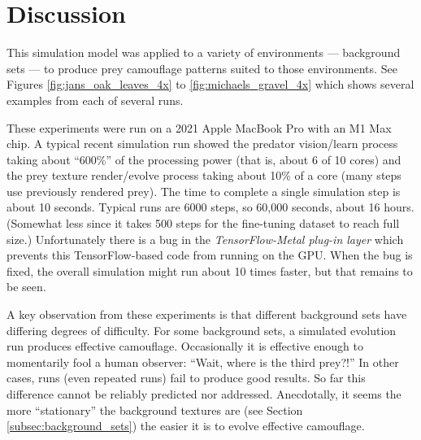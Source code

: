 \documentclass[acmtog]{acmart}
\newcommand{\jargon}[1]{\textit{#1}}
\begin{document}

\section{Discussion}
This simulation model was applied to a variety of environments — background sets — to produce prey camouflage patterns suited to those environments. See Figures \ref{fig:jans_oak_leaves_4x} to \ref{fig:michaels_gravel_4x} which shows several examples from each of several runs. 
\par
These experiments were run on a 2021 Apple MacBook Pro with an M1 Max chip. A typical recent simulation run showed the predator vision/learn process taking about “600\%” of the processing power (that is, about 6 of 10 cores) and the prey texture render/evolve process taking about 10\% of a core (many steps use previously rendered prey). The time to complete a single simulation step is about 10 seconds. Typical runs are 6000 steps, so 60,000 seconds, about 16 hours. (Somewhat less since it takes 500 steps for the fine-tuning dataset to reach full size.) Unfortunately there is a bug in the \jargon{TensorFlow-Metal plug-in layer} which prevents this TensorFlow-based code from running on the GPU. When the bug is fixed, the overall simulation might run about 10 times faster, but that remains to be seen.
\par
A key observation from these experiments is that different background sets have differing degrees of difficulty. For some background sets, a simulated evolution run produces effective camouflage. Occasionally it is effective enough to momentarily fool a human observer: “Wait, where is the third prey?!” In other cases, runs (even repeated runs) fail to produce good results. So far this difference cannot be reliably predicted nor addressed. Anecdotally, it seems the more “stationary” the background textures are (see Section \ref{subsec:background_sets}) the easier it is to evolve effective camouflage.
\par
\end{document}
